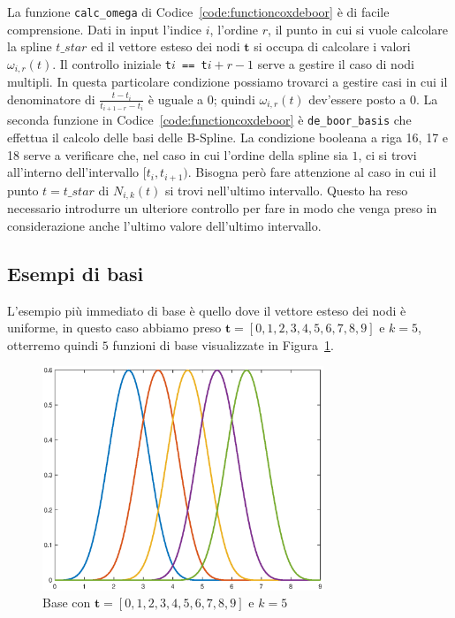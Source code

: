 \documentclass[a4paper, 10pt]{article}
\begin{document}
La funzione \texttt{calc\_omega} di Codice~\ref{code:functioncoxdeboor} è di facile comprensione. Dati in input
l'indice $i$, l'ordine $r$, il punto in cui si vuole calcolare la spline $t\_star$ ed il vettore esteso dei nodi $\mathbf{t}$ si occupa di calcolare i valori $\omega_{i, r}(t)$.
Il controllo iniziale \texttt{t\( i \) == t\( i+r-1 \)} serve a gestire il caso di nodi multipli. In questa particolare condizione possiamo trovarci a gestire casi in cui il denominatore di $\frac{t - t_i}{t_{i+1-r}-t_i}$ è uguale a $0$; quindi
$\omega_{i,r}(t)$ dev'essere posto a $0$. 
La seconda funzione in Codice~\ref{code:functioncoxdeboor} è \texttt{de\_boor\_basis} che effettua il calcolo delle basi delle B-Spline. 
La condizione booleana a riga 16, 17 e 18 serve a verificare che, nel caso 
in cui l'ordine della spline sia $1$, ci si trovi all'interno dell'intervallo $[t_i, t_{i+1} )$. Bisogna però fare attenzione al caso in cui 
il punto $t = t\_star$ di $N_{i, k}(t)$ si trovi nell'ultimo intervallo. Questo ha reso necessario introdurre un ulteriore controllo per fare in modo che venga 
preso in considerazione anche l'ultimo valore dell'ultimo intervallo.
\subsection{Esempi di basi}
L'esempio più immediato di base è quello dove il vettore esteso dei nodi è uniforme, in questo caso abbiamo preso $\mathbf{t} = [0, 1, 2, 3, 4, 5, 6, 7, 8, 9]$ e $k = 5$, otterremo quindi $5$
funzioni di base visualizzate in Figura~\ref{fig:first_basis}.
\begin{figure}[h]
  \centering
  \includegraphics[width=0.75\textwidth]{figure/uniform_not_multiple_basis.eps}
  \caption{Base con $\mathbf{t} = [0, 1, 2, 3, 4, 5, 6, 7, 8, 9]$ e $k = 5$}
  \label{fig:first_basis}
\end{figure} 
\end{document}
